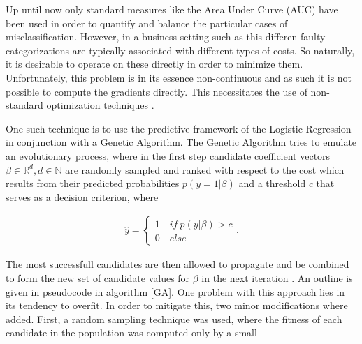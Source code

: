 
Up until now only standard measures like the Area Under Curve (AUC) have been used in order to quantify and balance the particular cases of misclassification. However, in a business setting such as this differen faulty categorizations are typically associated with different types of costs. So naturally, it is desirable to operate on these directly in order to minimize them. Unfortunately, this problem is in its essence non-continuous and as such it is not possible to compute the gradients directly. This necessitates the use of non-standard optimization techniques \cite{GAml}.

One such technique is to use the predictive framework of the Logistic Regression in conjunction with a Genetic Algorithm. The Genetic Algorithm tries to emulate an evolutionary process, where in the first step candidate coefficient vectors $\beta \in \mathbb{R}^d, d \in \mathbb{N}$ are randomly sampled and ranked with respect to the cost which results from their predicted probabilities $p(y=1|\beta)$ and a threshold $c$ that serves as a decision criterion, where

\begin{align*}
\hat{y} = \begin{cases}
  1 \quad if\ p(y|\beta) > c\\
  0 \quad else
\end{cases}.
\end{align*}

The most successfull candidates are then allowed to propagate and be combined to form the new set of candidate values for $\beta$ in the next iteration \cite{GAorigin}. An outline is given in pseudocode in algorithm \ref{GA}. One problem with this approach lies in its tendency to overfit. In order to mitigate this, two minor modifications where added. First, a random sampling technique was used, where the fitness of each candidate in the population was computed only by a small {\par}

